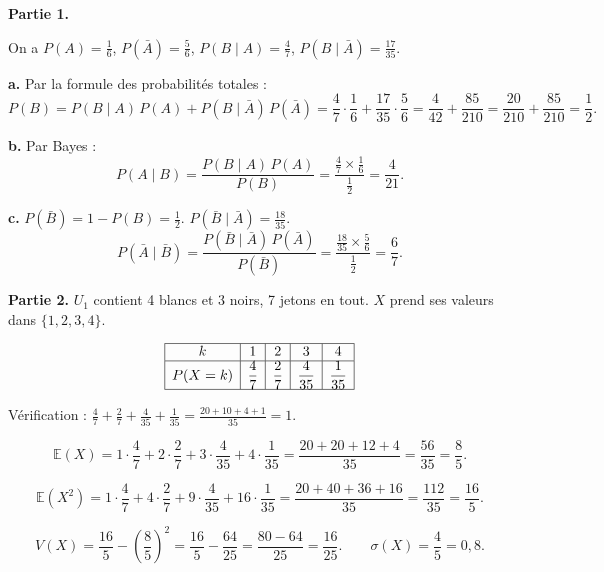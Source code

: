 \documentclass[12pt,a4paper]{article}
\begin{document}
\begin{boitecorrige}
\textbf{Partie 1.}

On a $P(A) = \tfrac{1}{6}$, $P(\bar{A}) = \tfrac{5}{6}$, $P(B \mid A) = \tfrac{4}{7}$, $P(B \mid \bar{A}) = \tfrac{17}{35}$.

\textbf{a.} Par la formule des probabilités totales :
\[
P(B) = P(B \mid A)\,P(A) + P(B \mid \bar{A})\,P(\bar{A})
= \frac{4}{7} \cdot \frac{1}{6} + \frac{17}{35} \cdot \frac{5}{6}
= \frac{4}{42} + \frac{85}{210} = \frac{20}{210} + \frac{85}{210} = \frac{1}{2}.
\]

\textbf{b.} Par Bayes :
\[
P(A \mid B) = \frac{P(B \mid A)\,P(A)}{P(B)} = \frac{\tfrac{4}{7} \times \tfrac{1}{6}}{\tfrac{1}{2}} = \frac{4}{21}.
\]

\textbf{c.} $P(\bar{B}) = 1 - P(B) = \tfrac{1}{2}$. $P(\bar{B} \mid \bar{A}) = \tfrac{18}{35}$.
\[
P(\bar{A} \mid \bar{B}) = \frac{P(\bar{B} \mid \bar{A})\,P(\bar{A})}{P(\bar{B})} = \frac{\tfrac{18}{35} \times \tfrac{5}{6}}{\tfrac{1}{2}} = \frac{6}{7}.
\]

\textbf{Partie 2.} $U_1$ contient 4 blancs et 3 noirs, 7 jetons en tout. $X$ prend ses valeurs dans $\{1, 2, 3, 4\}$.

\[
\begin{array}{|c|c|c|c|c|}
\hline
k & 1 & 2 & 3 & 4 \\
\hline
P(X=k) & \dfrac{4}{7} & \dfrac{2}{7} & \dfrac{4}{35} & \dfrac{1}{35} \\
\hline
\end{array}
\]

Vérification : $\tfrac{4}{7} + \tfrac{2}{7} + \tfrac{4}{35} + \tfrac{1}{35} = \tfrac{20+10+4+1}{35} = 1$.

\[
\mathbb{E}(X) = 1 \cdot \frac{4}{7} + 2 \cdot \frac{2}{7} + 3 \cdot \frac{4}{35} + 4 \cdot \frac{1}{35}
= \frac{20 + 20 + 12 + 4}{35} = \frac{56}{35} = \frac{8}{5}.
\]

\[
\mathbb{E}(X^2) = 1 \cdot \frac{4}{7} + 4 \cdot \frac{2}{7} + 9 \cdot \frac{4}{35} + 16 \cdot \frac{1}{35}
= \frac{20 + 40 + 36 + 16}{35} = \frac{112}{35} = \frac{16}{5}.
\]

\[
V(X) = \frac{16}{5} - \left(\frac{8}{5}\right)^2 = \frac{16}{5} - \frac{64}{25} = \frac{80 - 64}{25} = \frac{16}{25}.
\qquad \sigma(X) = \frac{4}{5} = 0{,}8.
\]
\end{boitecorrige}
\end{document}

